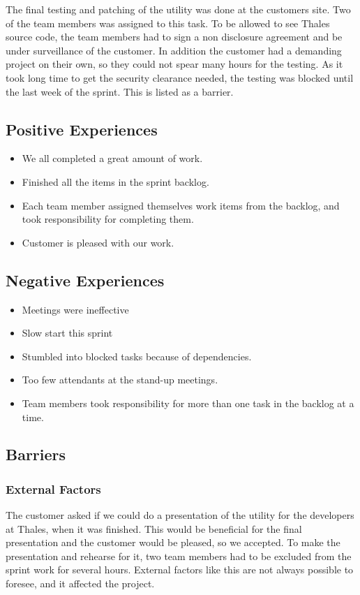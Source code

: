 The final testing and patching of the utility was done at the customers site. Two of the team members was assigned to this task. To be allowed to see Thales source code, the team members had to sign a non disclosure agreement and be under surveillance of the customer. In addition the customer had a demanding project on their own, so they could not spear many hours for the testing. As it took long time to get the security clearance needed, the testing was blocked until the last week of the sprint. This is listed as a barrier.

\subsection{Positive Experiences}
\begin{itemize}
\item We all completed a great amount of work.
\item Finished all the items in the sprint backlog.
\item Each team member assigned themselves work items from the backlog, and took responsibility for completing them.
\item Customer is pleased with our work.   
\end{itemize}

\subsection{Negative Experiences}
\begin{itemize}
\item Meetings were ineffective
\item Slow start this sprint
\item Stumbled into blocked tasks because of dependencies.
\item Too few attendants at the stand-up meetings.
\item Team members took responsibility for more than one task in the backlog at a time. 
\end{itemize}

\subsection{Barriers}
\subsubsection{External Factors}
The customer asked if we could do a presentation of the utility for the developers at Thales, when it was finished. This would be beneficial for the final presentation and the customer would be pleased, so we accepted. To make the presentation and rehearse for it, two team members had to be excluded from the sprint work for several hours. External factors like this are not always possible to foresee, and it affected the project.

